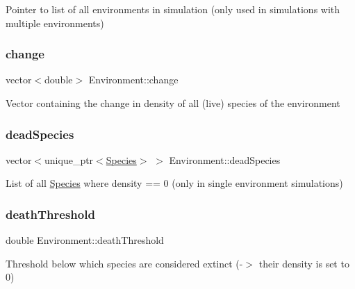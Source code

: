 Pointer to list of all environments in simulation (only used in simulations with multiple environments) \mbox{\label{classEnvironment_a4dac7620968f061a62c2b51f4a29e402}} 
\subsubsection{\texorpdfstring{change}{change}}
{\footnotesize\ttfamily vector$<$double$>$ Environment\+::change\hspace{0.3cm}{\ttfamily [protected]}}

Vector containing the change in density of all (live) species of the environment \mbox{\label{classEnvironment_a5ff095d15af0aaf954a0ad9afe5d8a01}} 
\subsubsection{\texorpdfstring{dead\+Species}{deadSpecies}}
{\footnotesize\ttfamily vector$<$unique\+\_\+ptr$<$\hyperlink{classSpecies}{Species}$>$ $>$ Environment\+::dead\+Species\hspace{0.3cm}{\ttfamily [protected]}}

List of all \hyperlink{classSpecies}{Species} where {\ttfamily density == 0} (only in single environment simulations) \mbox{\label{classEnvironment_a79a718ed66d6e70b38763150b4245064}} 
\subsubsection{\texorpdfstring{death\+Threshold}{deathThreshold}}
{\footnotesize\ttfamily double Environment\+::death\+Threshold\hspace{0.3cm}{\ttfamily [protected]}}

Threshold below which species are considered extinct (-\/$>$ their density is set to 0) \mbox{\label{classEnvironment_ab21bc1c8553a1649b306dc80f7db558b}} 
